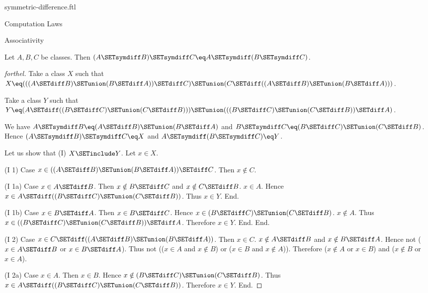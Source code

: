 \documentclass{naproche-library}
\begin{document}
\begin{smodule}[title=Symmetric Difference]{symmetric-difference.ftl}
\begin{sfragment}{Computation Laws}
  \begin{sfragment}{Associativity}
    \begin{proposition}[forthel,id=FOUNDATIONS_03_8680845204258816]
      Let $A, B, C$ be classes.
      Then $(A \SETsymdiff B) \SETsymdiff C \eq A \SETsymdiff (B \SETsymdiff C)$.
    \end{proposition}
    \begin{proof}[forthel]
      Take a class $X$ such that $X \eq (((A \SETdiff B) \SETunion (B \SETdiff A)) \SETdiff C) \SETunion (C \SETdiff ((A \SETdiff B) \SETunion (B \SETdiff A)))$.

      Take a class $Y$ such that $Y \eq (A \SETdiff ((B \SETdiff C) \SETunion (C \SETdiff B))) \SETunion (((B \SETdiff C) \SETunion (C \SETdiff B)) \SETdiff A)$.

      We have $A \SETsymdiff B \eq (A \SETdiff B) \SETunion (B \SETdiff A)$ and $B \SETsymdiff C \eq (B \SETdiff C) \SETunion (C \SETdiff B)$.
      Hence $(A \SETsymdiff B) \SETsymdiff C \eq X$ and $A \SETsymdiff (B \SETsymdiff C) \eq Y$.

      Let us show that (I) $X \SETinclude Y$.
        Let $x \in X$.

        (I 1) Case $x \in ((A \SETdiff B) \SETunion (B \SETdiff A)) \SETdiff C$.
          Then $x \notin C$.

          (I 1a) Case $x \in A \SETdiff B$.
            Then $x \notin B \SETdiff C$ and $x \notin C \SETdiff B$. $x \in A$.
            Hence $x \in A \SETdiff ((B \SETdiff C) \SETunion (C \SETdiff B))$.
            Thus $x \in Y$.
          End.

          (I 1b) Case $x \in B \SETdiff A$.
            Then $x \in B \SETdiff C$.
            Hence $x \in (B \SETdiff C) \SETunion (C \SETdiff B)$. $x \notin A$.
            Thus $x \in ((B \SETdiff C) \SETunion (C \SETdiff B)) \SETdiff A$.
            Therefore $x \in Y$.
          End.
        End.

        (I 2) Case $x \in C \SETdiff ((A \SETdiff B) \SETunion (B \SETdiff A))$.
          Then $x \in C$.
          $x \notin A \SETdiff B$ and $x \notin B \SETdiff A$.
          Hence not ($x \in A \SETdiff B$ or $x \in B \SETdiff A$).
          Thus not (($x \in A$ and $x \notin B$) or ($x \in B$ and $x \notin A$)).
          Therefore ($x \notin A$ or $x \in B$) and ($x \notin B$ or $x \in A$).

          (I 2a) Case $x \in A$.
            Then $x \in B$.
            Hence $x \notin (B \SETdiff C) \SETunion (C \SETdiff B)$.
            Thus $x \in A \SETdiff ((B \SETdiff C) \SETunion (C \SETdiff B))$.
            Therefore $x \in Y$.
          End.


\end{proof}
\end{sfragment}
\end{sfragment}
\end{smodule}
\end{document}
